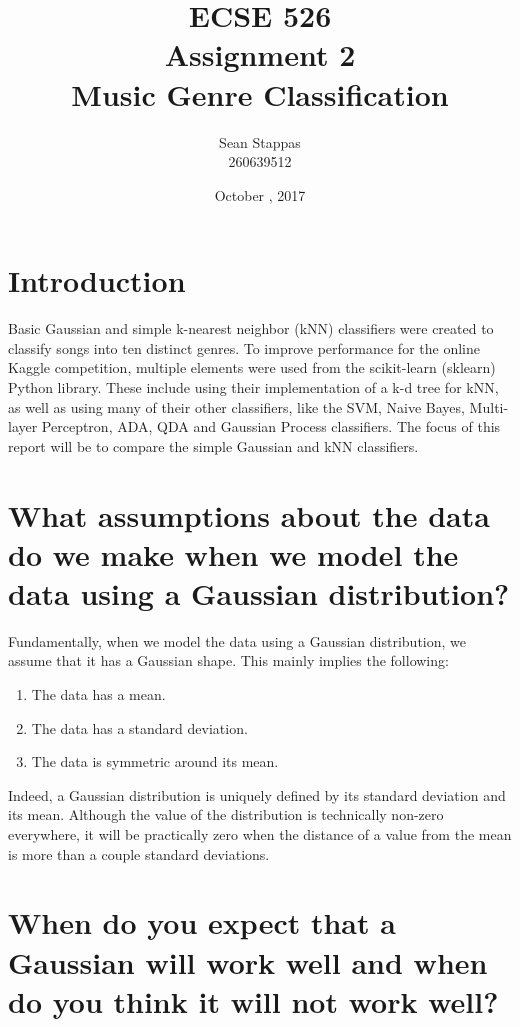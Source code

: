 \documentclass[a4paper,titlepage]{article}
\title{
	\textbf{ECSE 526 \\ Assignment 2}
	\\ \large Music Genre Classification
}
\author{Sean Stappas \\ 260639512}
\date{October \nth{19}, 2017}
\begin{document}
	\sloppy
	\maketitle
	\twocolumn
	
	\section*{Introduction}
	
	Basic Gaussian and simple k-nearest neighbor (kNN) classifiers were created to classify songs into ten distinct genres. To improve performance for the online Kaggle competition, multiple elements were used from the scikit-learn (sklearn) Python library. These include using their implementation of a k-d tree for kNN, as well as using many of their other classifiers, like the SVM, Naive Bayes, Multi-layer Perceptron, ADA, QDA and Gaussian Process classifiers. The focus of this report will be to compare the simple Gaussian and kNN classifiers.
	
	\section{What assumptions about the data do we make when we model the data using a Gaussian distribution?}
	
	Fundamentally, when we model the data using a Gaussian distribution, we assume that it has a Gaussian shape. This mainly implies the following:
	
	\begin{enumerate}
		\item The data has a mean.
		\item The data has a standard deviation.
		\item The data is symmetric around its mean.
	\end{enumerate}
	
	Indeed, a Gaussian distribution is uniquely defined by its standard deviation and its mean. Although the value of the distribution is technically non-zero everywhere, it will be practically zero when the distance of a value from the mean is more than a couple standard deviations.
	
	\section{When do you expect that a Gaussian will work well and when do you think it will not work well?}
	
\end{document}
